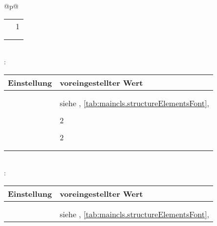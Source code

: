 \begin{longtable}{@{}p{\columnwidth}@{}}
\begin{tabularx}{\linewidth}{ll}
    \PValue{toclevel}    & 1 \\
    \PValue{tocnumwidth} & \PValue{2.3em}\\
    \PValue{tocstyle}    & \PValue{section} \\
    \bottomrule
    \end{tabularx} \\
    \addlinespace[\normalbaselineskip]
    : \\*
    \begin{tabularx}{\linewidth}{ll}
    \toprule
    Einstellung & voreingestellter Wert \\
    \midrule\nopagebreak
    \PValue{afterskip}   & \PValue{1.5ex plus .2ex} \\
    \PValue{beforeskip}  & \PValue{-3.25ex plus -1ex minus -.2ex} \\
    \PValue{font}        & siehe 
                           \DescRef{maincls.fontelement.subsection},
                           \autoref{tab:maincls.structureElementsFont}, 
                           \autopageref{tab:maincls.structureElementsFont} \\
    \PValue{indent}      & \PValue{0pt} \\
    \PValue{level}       & 2 \\
    \PValue{tocindent}   & \PValue{3.8em}\\
    \PValue{toclevel}    & 2 \\
    \PValue{tocnumwidth} & \PValue{3.2em}\\
    \PValue{tocstyle}    & \PValue{section} \\
    \bottomrule
    \end{tabularx} \\
    \addlinespace[\normalbaselineskip]
    : \\*
    \begin{tabularx}{\linewidth}{ll}
    \toprule
    Einstellung & voreingestellter Wert \\
    \midrule\nopagebreak
    \PValue{afterskip}   & \PValue{1.5ex plus .2ex} \\
    \PValue{beforeskip}  & \PValue{-3.25ex plus -1ex minus -.2ex} \\
    \PValue{font}        & siehe 
                           \DescRef{maincls.fontelement.subsubsection},
                           \autoref{tab:maincls.structureElementsFont}, 
                           \autopageref{tab:maincls.structureElementsFont} \\

\end{tabularx}
\end{longtable}
